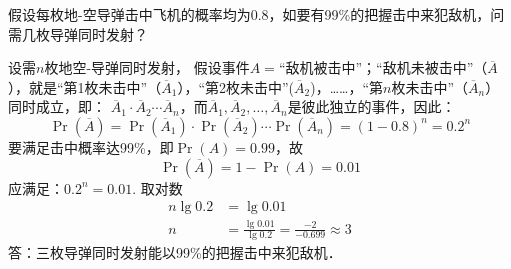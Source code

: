 \begin{example}
   假设每枚地-空导弹击中飞机的概率均为0.8，如要有99\%的把握击中来犯敌机，问需几枚导弹同时发射？ 
\end{example}


\begin{solution}
设需$n$枚地空-导弹同时发射，
假设事件$A=$“敌机被击中”；“敌机未被击中”（$\overline{A}$），就是“第1枚未击中”（$\overline{A}_1$），“第2枚未击中”($\overline{A}_2$)，……，“第$n$枚未击中”（$\overline{A}_n$）同时成立，即：
$\overline{A}_1\cdot \overline{A}_2\cdots \overline{A}_n$，而$\overline{A}_1, \overline{A}_2,\ldots,\overline{A}_n$是彼此独立的事件，因此：
\[\Pr(\overline{A})=\Pr(\overline{A}_1)\cdot \Pr(\overline{A}_2)\cdots\Pr(\overline{A}_n)=(1-0.8)^n=0.2^n\]
要满足击中概率达99\%，即$\Pr(A)=0.99$，故
\[\Pr(\overline{A})=1-\Pr(A)=0.01\]
应满足：$0.2^n=0.01$. 取对数
\[\begin{split}
    n\lg0.2&=\lg0.01\\
n&=\frac{\lg0.01}{\lg0.2}=\frac{-2}{-0.699}\approx 3
\end{split} \]
答：三枚导弹同时发射能以99\%的把握击中来犯敌机．    
\end{solution}

